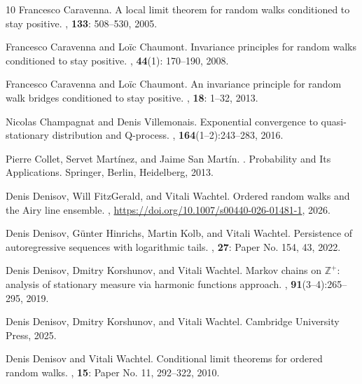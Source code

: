 \documentclass[12pt]{article}
\newcommand{\1}{\mathds{1}}
\theoremstyle{definition}
\theoremstyle{plain}
\theoremstyle{remark}
\begin{document}
\begin{thebibliography}{10}
Francesco Caravenna.
\newblock A local limit theorem for random walks conditioned to stay positive.
, {\bf 133}: 508--530, 2005.

Francesco Caravenna and Lo\"ic Chaumont.
\newblock Invariance principles for random walks conditioned to stay positive.
, {\bf 44}(1): 170--190, 2008.

Francesco Caravenna and Lo\"ic Chaumont.
\newblock An invariance principle for random walk bridges conditioned to stay positive.
, {\bf 18}: 1--32, 2013.

Nicolas Champagnat and Denis Villemonais.
\newblock Exponential convergence to quasi-stationary distribution and {Q}-process.
, {\bf 164}(1--2):243--283, 2016.

Pierre Collet, Servet Mart{\'i}nez, and Jaime San Mart{\'i}n.
.
\newblock Probability and Its Applications. Springer, Berlin, Heidelberg, 2013.

Denis Denisov, Will FitzGerald, and Vitali Wachtel.
\newblock Ordered random walks and the Airy line ensemble. 
, \url{https://doi.org/10.1007/s00440-026-01481-1}, 2026.

Denis Denisov, G\"unter Hinrichs, Martin Kolb, and Vitali Wachtel.
\newblock Persistence of autoregressive sequences with logarithmic tails.
, {\bf 27}: Paper No. 154, 43, 2022.

Denis Denisov, Dmitry Korshunov, and Vitali Wachtel.
\newblock Markov chains on $\mathbb{Z}^+$: analysis of stationary measure via
harmonic functions approach.
, {\bf 91}(3--4):265--295, 2019.

Denis Denisov, Dmitry Korshunov, and Vitali Wachtel.
 Cambridge University Press, 2025.

Denis Denisov and Vitali Wachtel.
\newblock Conditional limit theorems for ordered random walks. 
, {\bf 15}: Paper No. 11, 292--322, 2010.


\end{thebibliography}
\end{document}
